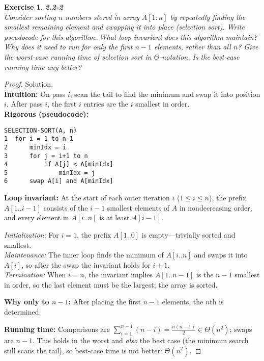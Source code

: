 \documentclass[12pt]{article}
\newtheorem{exercise}[theorem]{Exercise}
\theoremstyle{definition}
\begin{document}
\newpage

\begin{exercise}
\noindent
\textbf{2.2-2}\\
\noindent
Consider sorting $n$ numbers stored in array $A[1:n]$ by repeatedly finding the smallest remaining
element and swapping it into place (selection sort). Write pseudocode for this algorithm. What loop
invariant does this algorithm maintain? Why does it need to run for only the first $n-1$ elements,
rather than all $n$? Give the worst-case running time of selection sort in $\Theta$-notation. Is the
best-case running time any better?
\end{exercise}

\vspace{1pt}

\begin{proof}
Solution.\\

\noindent
\textbf{Intuition:} On pass $i$, scan the tail to find the minimum and swap it into position $i$.
After pass $i$, the first $i$ entries are the $i$ smallest in order.\\

\noindent
\textbf{Rigorous (pseudocode):}
\begin{verbatim}
SELECTION-SORT(A, n)
1  for i = 1 to n-1
2      minIdx = i
3      for j = i+1 to n
4          if A[j] < A[minIdx]
5              minIdx = j
6      swap A[i] and A[minIdx]
\end{verbatim}

\noindent
\textbf{Loop invariant:}
At the start of each outer iteration $i$ ($1\le i\le n$),
the prefix $A[1..i-1]$ consists of the $i-1$ smallest elements of $A$ in nondecreasing order,
and every element in $A[i..n]$ is at least $A[i-1]$.

\emph{Initialization:} For $i=1$, the prefix $A[1..0]$ is empty—trivially sorted and smallest.\\
\emph{Maintenance:} The inner loop finds the minimum of $A[i..n]$ and swaps it into $A[i]$,
so after the swap the invariant holds for $i+1$.\\
\emph{Termination:} When $i=n$, the invariant implies $A[1..n-1]$ is the $n-1$ smallest in order,
so the last element must be the largest; the array is sorted.

\noindent
\textbf{Why only to $n-1$:} After placing the first $n-1$ elements, the $n$th is determined.

\noindent
\textbf{Running time:} Comparisons are $\sum_{i=1}^{n-1}(n-i)=\frac{n(n-1)}{2}\in \Theta(n^2)$; swaps are $n-1$.
This holds in the worst and \emph{also} the best case (the minimum search still scans the tail),
so best-case time is not better: $\Theta(n^2)$.
\end{proof}
\end{document}
